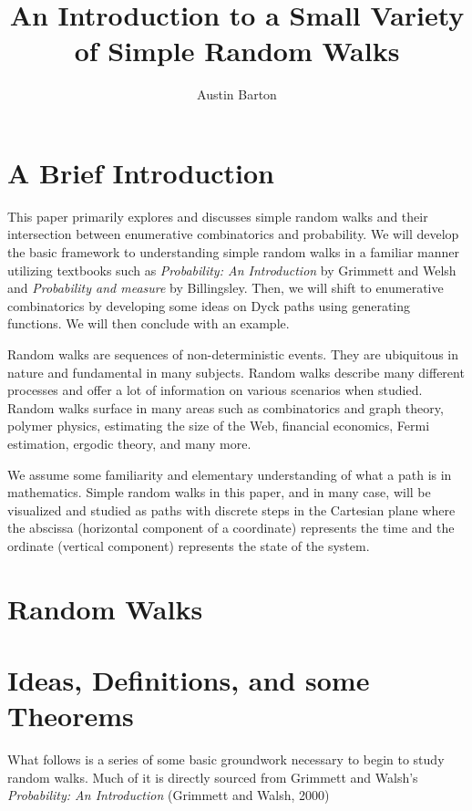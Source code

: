 \documentclass[12pt]{article}
\title{\hspace{28pt}\textbf{An Introduction to a Small Variety of \newline Simple Random Walks}}
\author[1]{Austin Barton}
\affil[1]{MATH 3235, Georgia Institute of Technology}
\theoremstyle{definition}
\numberwithin{equation}{section}
\begin{document}
\maketitle

\thispagestyle{empty}

\section*{A Brief Introduction}

This paper primarily explores and discusses simple random walks and their intersection between enumerative combinatorics and probability. We will develop the basic framework to understanding simple random walks in a familiar manner utilizing textbooks such as \emph{Probability: An Introduction} by Grimmett and Welsh and \emph{Probability and measure} by Billingsley. Then, we will shift to enumerative combinatorics by developing some ideas on Dyck paths using generating functions. We will then conclude with an example.

Random walks are sequences of non-deterministic events. They are ubiquitous in nature and fundamental in many subjects. Random walks describe many different processes and offer a lot of information on various scenarios when studied. Random walks surface in many areas such as
combinatorics and graph theory, polymer physics, estimating the size of the Web, financial economics, Fermi estimation, ergodic theory, and many more.

We assume some familiarity and elementary understanding of what a path is in mathematics. 
Simple random walks in this paper, and in many case, will be visualized and studied as paths with discrete steps in the Cartesian plane where the abscissa (horizontal component of a coordinate) represents the time and the ordinate (vertical component) represents the state of the system.

\section*{Random Walks}

\section{Ideas, Definitions, and some Theorems}
What follows is a series of some basic groundwork necessary to begin to study random walks. Much of it is directly sourced from Grimmett and Walsh's \emph{Probability: An Introduction} (Grimmett and Walsh, 2000)
\end{document}
